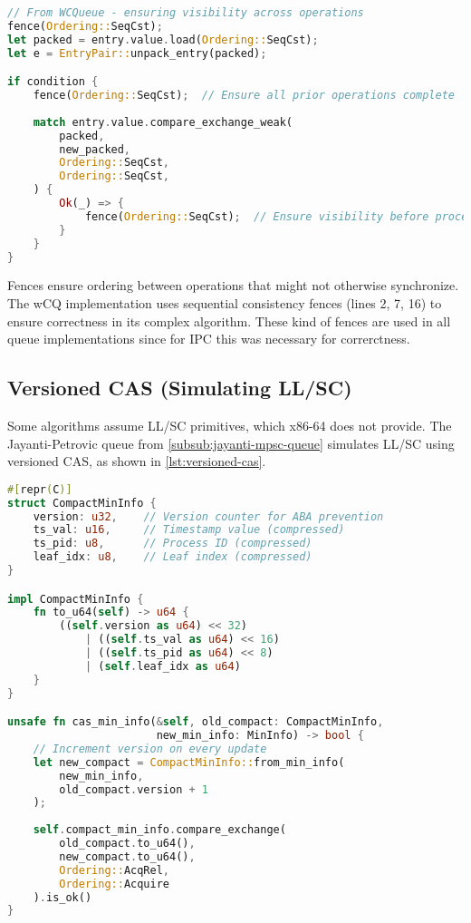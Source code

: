 \begin{lstlisting}[language=Rust, style=boxed, caption={Explicit memory fence usage}, label={lst:memory-fences}]
// From WCQueue - ensuring visibility across operations
fence(Ordering::SeqCst);
let packed = entry.value.load(Ordering::SeqCst);
let e = EntryPair::unpack_entry(packed);

if condition {
    fence(Ordering::SeqCst);  // Ensure all prior operations complete
    
    match entry.value.compare_exchange_weak(
        packed,
        new_packed,
        Ordering::SeqCst,
        Ordering::SeqCst,
    ) {
        Ok(_) => {
            fence(Ordering::SeqCst);  // Ensure visibility before proceeding
        }
    }
}
\end{lstlisting}

Fences ensure ordering between operations that might not otherwise synchronize. The \ac{wCQ} implementation uses sequential consistency fences (lines 2, 7, 16) to ensure correctness in its complex algorithm. These kind of fences are used in all queue implementations since for \ac{IPC} this was necessary for correrctness. 

\subsection{Versioned \acf{CAS} (Simulating \acf{LL/SC})}

Some algorithms assume \ac{LL/SC} primitives, which x86-64 does not provide. The Jayanti-Petrovic queue from \cref{subsub:jayanti-mpsc-queue} simulates \ac{LL/SC} using versioned \ac{CAS}, as shown in \cref{lst:versioned-cas}.

\begin{lstlisting}[language=Rust, style=boxed, caption={Versioned CAS for LL/SC simulation}, label={lst:versioned-cas}]
#[repr(C)]
struct CompactMinInfo {
    version: u32,    // Version counter for ABA prevention
    ts_val: u16,     // Timestamp value (compressed)
    ts_pid: u8,      // Process ID (compressed)  
    leaf_idx: u8,    // Leaf index (compressed)
}

impl CompactMinInfo {
    fn to_u64(self) -> u64 {
        ((self.version as u64) << 32)
            | ((self.ts_val as u64) << 16)
            | ((self.ts_pid as u64) << 8)
            | (self.leaf_idx as u64)
    }
}

unsafe fn cas_min_info(&self, old_compact: CompactMinInfo, 
                       new_min_info: MinInfo) -> bool {
    // Increment version on every update
    let new_compact = CompactMinInfo::from_min_info(
        new_min_info, 
        old_compact.version + 1
    );
    
    self.compact_min_info.compare_exchange(
        old_compact.to_u64(),
        new_compact.to_u64(),
        Ordering::AcqRel,
        Ordering::Acquire
    ).is_ok()
}
\end{lstlisting}

